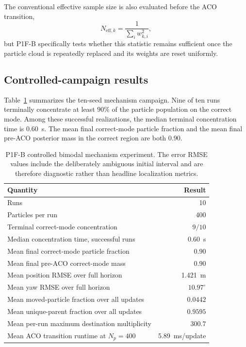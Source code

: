 The conventional effective sample size is also evaluated before the ACO transition,
\begin{equation}
    N_{\mathrm{eff},k}=\frac{1}{\sum_i w_{k,i}^2},
\end{equation}
but P1F-B specifically tests whether this statistic remains sufficient once the particle cloud is repeatedly replaced and its weights are reset uniformly.

\subsection{Controlled-campaign results}
Table~\ref{tab:p1fb_controlled} summarizes the ten-seed mechanism campaign. Nine of ten runs terminally concentrate at least $90\%$ of the particle population on the correct mode. Among these successful realizations, the median terminal concentration time is \SI{0.60}{s}. The mean final correct-mode particle fraction and the mean final pre-ACO posterior mass in the correct region are both $0.90$.

\begin{table}[htbp]
    \centering
    \caption{P1F-B controlled bimodal mechanism experiment. The error RMSE values include the deliberately ambiguous initial interval and are therefore diagnostic rather than headline localization metrics.}
    \label{tab:p1fb_controlled}
    \begin{tabular}{lr}
        \toprule
        Quantity & Result\\
        \midrule
        Runs & 10\\
        Particles per run & 400\\
        Terminal correct-mode concentration & $9/10$\\
        Median concentration time, successful runs & \SI{0.60}{s}\\
        Mean final correct-mode particle fraction & $0.90$\\
        Mean final pre-ACO correct-mode mass & $0.90$\\
        Mean position RMSE over full horizon & \SI{1.421}{m}\\
        Mean yaw RMSE over full horizon & $10.97^\circ$\\
        Mean moved-particle fraction over all updates & $0.0442$\\
        Mean unique-parent fraction over all updates & $0.9595$\\
        Mean per-run maximum destination multiplicity & $300.7$\\
        Mean ACO transition runtime at $N_p=400$ & \SI{5.89}{ms}/update\\
        \bottomrule
    \end{tabular}
\end{table}

